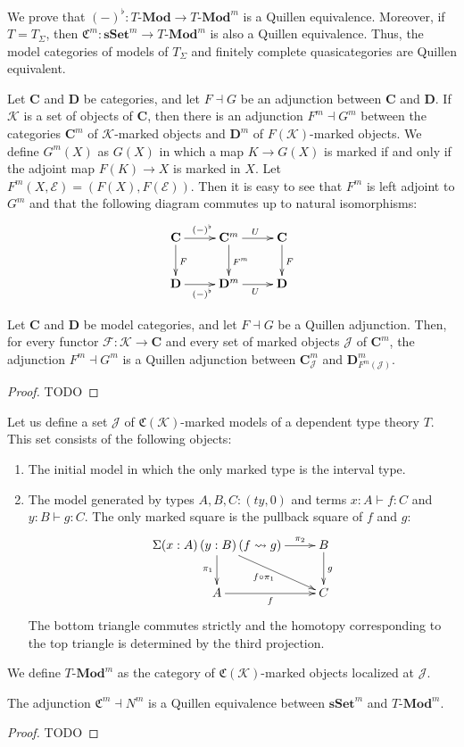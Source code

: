 \documentclass[reqno]{amsart}
\theoremstyle{definition}
\theoremstyle{remark}
\newcommand{\idtype}{\rightsquigarrow}
\newcommand{\cat}[1]{\mathbf{#1}}
\newcommand{\C}{\cat{C}}
\newcommand{\D}{\cat{D}}
\newcommand{\Mod}[1]{#1\text{-}\cat{Mod}}
\newcommand{\sSet}{\cat{sSet}}
\newcommand{\K}{$\mathcal{K}$}
\numberwithin{figure}{section}
\begin{document}
We prove that $(-)^\flat : \Mod{T} \to \Mod{T}^m$ is a Quillen equivalence.
Moreover, if $T = T_\Sigma$, then $\mathfrak{C}^m : \sSet^m \to \Mod{T}^m$ is also a Quillen equivalence.
Thus, the model categories of models of $T_\Sigma$ and finitely complete quasicategories are Quillen equivalent.

Let $\C$ and $\D$ be categories, and let $F \dashv G$ be an adjunction between $\C$ and $\D$.
If $\mathcal{K}$ is a set of objects of $\C$, then there is an adjunction $F^m \dashv G^m$ between
the categories $\C^m$ of \K-marked objects and $\D^m$ of $F(\mathcal{K})$-marked objects.
We define $G^m(X)$ as $G(X)$ in which a map $K \to G(X)$ is marked if and only if the adjoint map $F(K) \to X$ is marked in $X$.
Let $F^m(X,\mathcal{E}) = (F(X),F(\mathcal{E}))$.
Then it is easy to see that $F^m$ is left adjoint to $G^m$ and that the following diagram commutes up to natural isomorphisms:
\[ \xymatrix{ \C \ar[r]^{(-)^\flat} \ar[d]^F & \C^m \ar[d]^{F^m} \ar[r]^U & \C \ar[d]^F \\
              \D \ar[r]_{(-)^\flat}          & \D^m \ar[r]_U              & \D
            } \]

\begin{lem}
Let $\C$ and $\D$ be model categories, and let $F \dashv G$ be a Quillen adjunction.
Then, for every functor $\mathcal{F} : \mathcal{K} \to \C$ and every set of marked objects $\mathcal{J}$ of $\C^m$,
the adjunction $F^m \dashv G^m$ is a Quillen adjunction between $\C^m_\mathcal{J}$ and $\D^m_{F^m(\mathcal{J})}$.
\end{lem}
\begin{proof}
TODO
\end{proof}

Let us define a set $\mathcal{J}$ of $\mathfrak{C}(\mathcal{K})$-marked models of a dependent type theory $T$.
This set consists of the following objects:
\begin{enumerate}
\item The initial model in which the only marked type is the interval type.
\item The model generated by types $A,B,C : (ty,0)$ and terms $x : A \vdash f : C$ and $y : B \vdash g : C$.
The only marked square is the pullback square of $f$ and $g$:
\[ \xymatrix{ \Sigma (x : A)\,(y : B)\,(f \idtype g) \ar[r]^-{\pi_2} \ar[d]_{\pi_1} \ar[dr]_{f \circ \pi_1} & B \ar[d]^g \\
              A \ar[r]_f                                                                                    & C
            } \]
The bottom triangle commutes strictly and the homotopy corresponding to the top triangle is determined by the third projection.
\end{enumerate}
We define $\Mod{T}^m$ as the category of $\mathfrak{C}(\mathcal{K})$-marked objects localized at $\mathcal{J}$.

\begin{thm}
The adjunction $\mathfrak{C}^m \dashv N^m$ is a Quillen equivalence between $\sSet^m$ and $\Mod{T}^m$.
\end{thm}
\begin{proof}
TODO
\end{proof}



\end{document}
